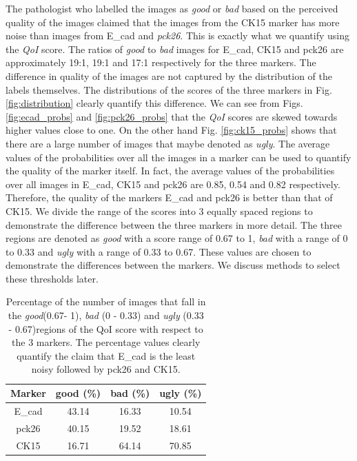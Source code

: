 The pathologist who labelled the images as \textit{good} or \textit{bad} based on the perceived quality of the images claimed that the images from the CK15 marker has more noise than images from E\_cad and \textit{pck26}. This is exactly what we quantify using the \textit{QoI} score. The ratios of \textit{good} to \textit{bad} images for E\_cad, CK15 and pck26 are approximately 19:1, 19:1 and 17:1 respectively for the three markers. The difference in quality of the images are not captured by the distribution of the labels themselves. The distributions of the scores of the three markers in Fig. \ref{fig:distribution} clearly quantify this difference. We can see from Figs. \ref{fig:ecad_probs} and \ref{fig:pck26_probs} that the \textit{QoI} scores are skewed towards higher values close to one. On the other hand Fig. \ref{fig:ck15_probs} shows that there are a large number of images that maybe denoted as \textit{ugly}. The average values of the probabilities over all the images in a marker can be used to quantify the quality of the marker itself. In fact, the average values of the probabilities over all images in E\_cad, CK15 and pck26 are 0.85, 0.54 and 0.82 respectively.  Therefore, the quality of the markers E\_cad and pck26 is better than that of CK15. We divide the range of the scores into 3 equally spaced regions to demonstrate the difference between the three markers in more detail. The three regions are denoted as \textit{good} with a score range of 0.67 to 1, \textit{bad} with a range of 0 to 0.33 and \textit{ugly} with a range of 0.33 to 0.67. These values are chosen to demonstrate the differences between the markers. We discuss methods to select these thresholds later.

\begin{table}[ht!]
\centering
\caption{Percentage of the number of images that fall in the \textit{good}(0.67- 1), \textit{bad} (0 - 0.33) and \textit{ugly} (0.33 - 0.67)regions of the QoI score with respect to the 3 markers. The percentage values clearly quantify the claim that E\_cad is the least noisy followed by pck26 and CK15.}
\begin{tabular}{ |c|c|c|c|} 
 \hline
\textbf{Marker} & \textbf{good} (\%)& \textbf{bad} (\%) & \textbf{ugly} (\%)\\ 
 \hline
E\_cad & 43.14 & 16.33 & 10.54\\
 \hline
pck26 & 40.15 & 19.52 & 18.61\\
 \hline
CK15 & 16.71 & 64.14 & 70.85\\
 \hline
 \end{tabular}
\label{table:scores}
\end{table}


